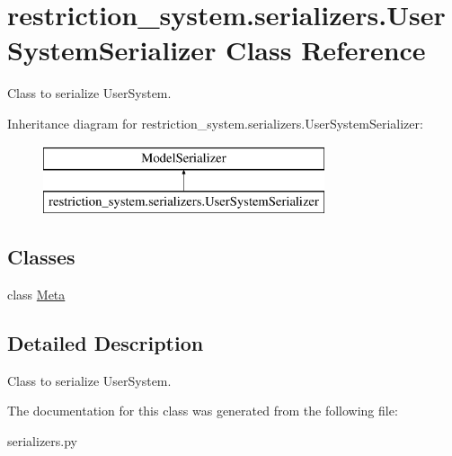 \hypertarget{classrestriction__system_1_1serializers_1_1UserSystemSerializer}{}\section{restriction\+\_\+system.\+serializers.\+User\+System\+Serializer Class Reference}
\label{classrestriction__system_1_1serializers_1_1UserSystemSerializer}


Class to serialize User\+System.  


Inheritance diagram for restriction\+\_\+system.\+serializers.\+User\+System\+Serializer\+:\begin{figure}[H]
\begin{center}
\leavevmode
\includegraphics[height=2.000000cm]{classrestriction__system_1_1serializers_1_1UserSystemSerializer}
\end{center}
\end{figure}
\subsection*{Classes}
\begin{DoxyCompactItemize}
\item 
class \hyperlink{classrestriction__system_1_1serializers_1_1UserSystemSerializer_1_1Meta}{Meta}
\end{DoxyCompactItemize}


\subsection{Detailed Description}
Class to serialize User\+System. 

The documentation for this class was generated from the following file\+:\begin{DoxyCompactItemize}
\item 
serializers.\+py\end{DoxyCompactItemize}
